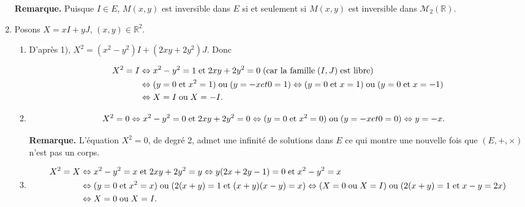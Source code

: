 \documentclass[11pt,a4paper]{article}
\newcommand{\Rr}{\mathbb{R}} \newcommand{\R}{\mathbb{R}}
\begin{document}
\begin{enumerate}
\textbf{Remarque.} Puisque $I\in E$, $M(x,y)$ est inversible dans $E$ si et seulement si $M(x,y)$ est inversible dans $\mathcal{M}_2(\Rr)$.

\item  Posons $X= xI+yJ$, $(x,y)\in\Rr^2$. 

  \begin{enumerate}
  \item D'après 1), $X^2=(x^2-y^2)I+(2xy+2y^2)J$. Donc

\begin{align*}\ensuremath
X^2= I&\Leftrightarrow x^2-y^2 = 1\;\text{et}\;2xy+2y^2= 0\;(\text{car la famille}\;(I,J)\;\text{est libre})\\
 &\Leftrightarrow (y = 0\;\text{et}\;x^2 = 1)\;\text{ou}\;(y = -x et 0 = 1)\Leftrightarrow(y = 0\;\text{et}\;x = 1)\;\text{ou}\;(y = 0\;\text{et}\;x = -1)\\
  &\Leftrightarrow X = I\;\text{ou}\;X = -I.
\end{align*}
 
\begin{center}
\end{center}

  \item
\begin{align*}\ensuremath
X^2=0&\Leftrightarrow x^2-y^2 =0\;\text{et}\;2xy+2y^2= 0\Leftrightarrow (y = 0\;\text{et}\;x^2 = 0)\;\text{ou}\;(y = -x et 0 = 0)\Leftrightarrow y=-x.
\end{align*}

\begin{center}
\shadowbox{
$\mathcal{S}=\{x(I-J),\;x\in\Rr\}$.
}
\end{center}

\textbf{Remarque.} L'équation $X^2=0$, de degré 2, admet une infinité de solutions dans $E$ ce qui montre une nouvelle fois que $(E,+,\times)$ n'est pas un corps.

  \item 

\begin{align*}\ensuremath
X^2=X&\Leftrightarrow x^2-y^2 =x\;\text{et}\;2xy+2y^2= y\Leftrightarrow y(2x+2y-1)= 0\;\text{et}\;x^2-y^2=x\\
 &\Leftrightarrow(y = 0\;\text{et}\;x^2= x)\;\text{ou}\;(2(x+y)=1\;\text{et}\;(x+y)(x-y)=x)\Leftrightarrow(X = 0\;\text{ou}\;X = I)\;\text{ou}\;(2(x+y)=1\;\text{et}\;x-y=2x)\\
  &\Leftrightarrow X = 0\;\text{ou}\;X =I.
\end{align*}


\end{enumerate}
\end{enumerate}
\end{document}
